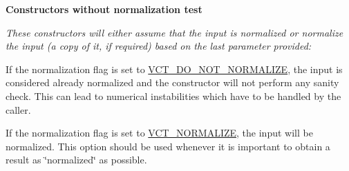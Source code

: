 \begin{Indent}{\bf Constructors without normalization test}\par
{\em These constructors will either assume that the input is normalized or normalize the input (a copy of it, if required) based on the last parameter provided\-: 
\begin{DoxyItemize}
\item If the normalization flag is set to \hyperlink{vct_forward_declarations_8h_a6fd516b0c35fa9967b4da5f03a788985}{V\-C\-T\-\_\-\-D\-O\-\_\-\-N\-O\-T\-\_\-\-N\-O\-R\-M\-A\-L\-I\-Z\-E}, the input is considered already normalized and the constructor will not perform any sanity check. This can lead to numerical instabilities which have to be handled by the caller.


\item If the normalization flag is set to \hyperlink{vct_forward_declarations_8h_ae54c682b919a7c5743ea498810518565}{V\-C\-T\-\_\-\-N\-O\-R\-M\-A\-L\-I\-Z\-E}, the input will be normalized. This option should be used whenever it is important to obtain a result as \char`\"{}normalized\char`\"{} as possible.



\end{DoxyItemize}}
\end{Indent}
